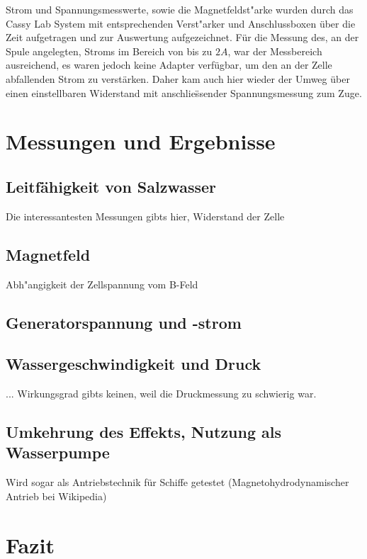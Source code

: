 \documentclass[11pt]{scrartcl}
\begin{document}
Strom und Spannungsmesswerte, sowie die Magnetfeldst"arke wurden durch das Cassy Lab System mit entsprechenden Verst"arker und Anschlussboxen \"uber die Zeit aufgetragen und zur Auswertung aufgezeichnet. F\"ur die Messung des, an der Spule angelegten, Stroms im Bereich von bis zu $2A$, war der Messbereich ausreichend, es waren jedoch keine Adapter verf\"ugbar, um den an der Zelle abfallenden Strom zu verst\"arken. Daher kam auch hier wieder der Umweg \"uber einen einstellbaren Widerstand mit anschlie\"ssender Spannungsmessung zum Zuge.

\section{Messungen und Ergebnisse}

\subsection{Leitfähigkeit von Salzwasser}		%
Die interessantesten Messungen gibts hier, Widerstand der Zelle

\subsection{Magnetfeld}			%
Abh"angigkeit der Zellspannung vom B-Feld

\subsection{Generatorspannung und -strom}		%

\subsection{Wassergeschwindigkeit und Druck}		%
... Wirkungsgrad gibts keinen, weil die Druckmessung zu schwierig war.

\subsection{Umkehrung des Effekts, Nutzung als Wasserpumpe}		%
Wird sogar als Antriebstechnik für Schiffe getestet (Magnetohydrodynamischer Antrieb bei Wikipedia)

\section{Fazit}		%

\newpage
\end{document}
